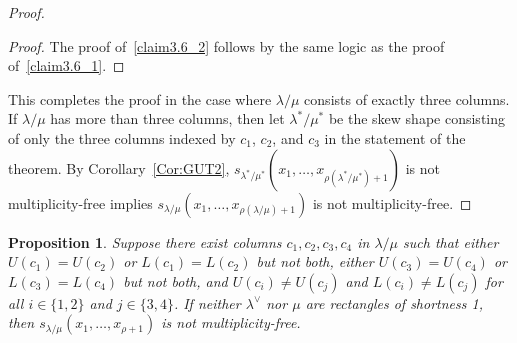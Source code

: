 \documentclass[10pt]{article}
\newtheorem{prop}[theorem]{Proposition}
\theoremstyle{definition}
\begin{document}
\begin{proof}
\begin{proof}
The proof of~\ref{claim3.6_2} follows by the same logic as the proof of~\ref{claim3.6_1}.
\end{proof}

This completes the proof in the case where $\lambda/\mu$ consists of exactly three columns. If $\lambda/\mu$ has more than three columns, then let $\lambda^*/\mu^*$ be the skew shape consisting of only the three columns indexed by $c_1$, $c_2$, and $c_3$ in the statement of the theorem. By Corollary~\ref{Cor:GUT2}, $s_{\lambda^*/\mu^*}(x_1,\dots, x_{\rho(\lambda^*/\mu^*) + 1})$ is not multiplicity-free implies $s_{\lambda/\mu}(x_1,\dots, x_{\rho(\lambda/\mu) + 1})$ is not multiplicity-free.
\end{proof}

\begin{prop}
\label{prop:4col}
Suppose there exist columns $c_1,c_2,c_3,c_4$ in $\lambda/\mu$ such that either $U(c_1)=U(c_2)$ or $L(c_1)=L(c_2)$ but not both, either $U(c_3)=U(c_4)$ or $L(c_3)=L(c_4)$ but not both, and $U(c_i)\not=U(c_j)$ and $L(c_i)\not=L(c_j)$ for all $i\in \{1,2\}$ and $j\in \{3,4\}$. If neither $\lambda^\vee$ nor $\mu$ are rectangles of shortness 1, then $s_{\lambda/\mu}(x_1,\ldots,x_{\rho+1})$ is not multiplicity-free.
\end{prop}
\end{document}
